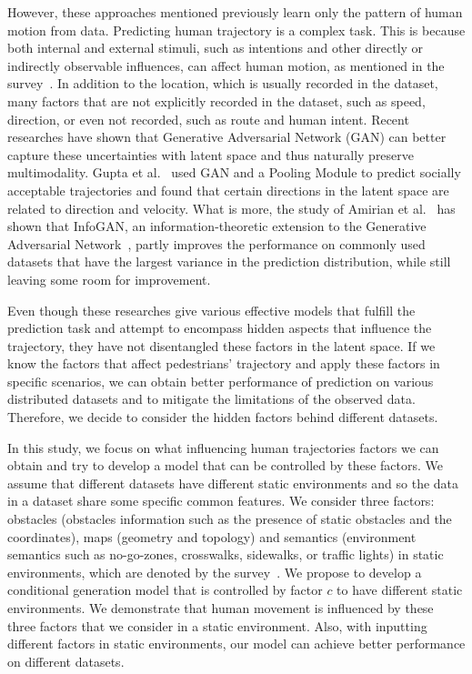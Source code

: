 \documentclass[sigconf]{acmart}
\begin{document}
However, these approaches mentioned previously learn only the pattern of human motion from data. Predicting human trajectory is a complex task. This is because both internal and external stimuli, such as intentions and other directly or indirectly observable influences, can affect human motion, as mentioned in the survey~\cite{humanmotionsurvey}. In addition to the location, which is usually recorded in the dataset, many factors that are not explicitly recorded in the dataset, such as speed, direction, or even not recorded, such as route and human intent. Recent researches have shown that Generative Adversarial Network (GAN) can better capture these uncertainties with latent space and thus naturally preserve multimodality. Gupta et al.~\cite{Gupta_2018_CVPR} used GAN and a Pooling Module to predict socially acceptable trajectories and found that certain directions in the latent space are related to direction and velocity. What is more, the study of Amirian et al.~\cite{Amirian_2019_CVPR_Workshops} has shown that InfoGAN, an information-theoretic extension to the Generative Adversarial Network~\cite{infogan}, partly improves the performance on commonly used datasets that have the largest variance in the prediction distribution, while still leaving some room for improvement.

Even though these researches give various effective models that fulfill the prediction task and attempt to encompass hidden aspects that influence the trajectory, they have not disentangled these factors in the latent space. If we know the factors that affect pedestrians' trajectory and apply these factors in specific scenarios, we can obtain better performance of prediction on various distributed datasets and to mitigate the limitations of the observed data. Therefore, we decide to consider the hidden factors behind different datasets.

In this study, we focus on what influencing human trajectories factors we can obtain and try to develop a model that can be controlled by these factors. We assume that different datasets have different static environments and so the data in a dataset share some specific common features. We consider three factors: obstacles (obstacles information such as the presence of static obstacles and the coordinates), maps (geometry and topology) and semantics (environment semantics such as no-go-zones, crosswalks, sidewalks, or traffic lights) in static environments, which are denoted by the survey~\cite{humanmotionsurvey}. We propose to develop a conditional generation model that is controlled by factor $c$ to have different static environments. We demonstrate that human movement is influenced by these three factors that we consider in a static environment. Also, with inputting different factors in static environments, our model can achieve better performance on different datasets.
\end{document}
